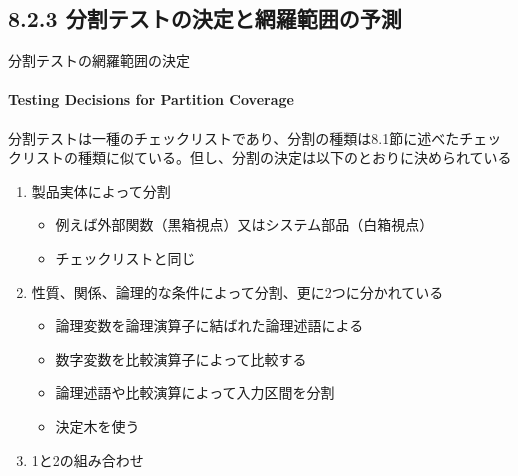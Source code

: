 \subsection{8.2.3 分割テストの決定と網羅範囲の予測}
\begin{frame}{分割テストの網羅範囲の決定}
\framesubtitle{Testing Decisions for Partition Coverage}
分割テストは一種のチェックリストであり、分割の種類は8.1節に述べたチェックリストの種類に似ている。但し、分割の決定は以下のとおりに決められている
\begin{enumerate}
\item 製品実体によって分割
    \begin{itemize}
    \item 例えば外部関数（黒箱視点）又はシステム部品（白箱視点）
    \item<uncover@2-|alert@2>
    チェックリストと同じ
    \end{itemize}
\item 性質、関係、論理的な条件によって分割、更に2つに分かれている
    \begin{itemize}
    \item 論理変数を論理演算子に結ばれた論理述語による 
    \item 数字変数を比較演算子によって比較する
    \item<uncover@3-|alert@3>
    論理述語や比較演算によって入力区間を分割
    \item<uncover@4-|alert@4>
    決定木を使う
    \end{itemize}
\item 1と2の組み合わせ 
\end{enumerate}
\end{frame}
